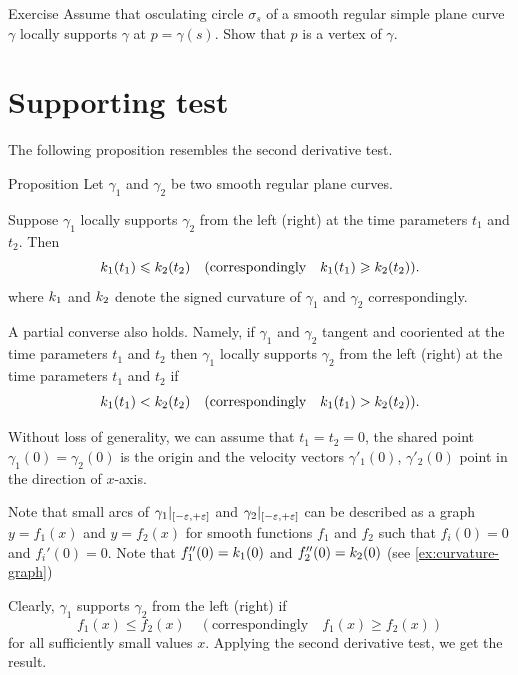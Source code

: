 \begin{thm}{Exercise}\label{ex:vertex-support}
Assume that osculating circle $\sigma_s$ of a smooth regular simple plane curve $\gamma$ locally supports $\gamma$ at $p=\gamma(s)$.
Show that $p$ is a vertex of $\gamma$.
\end{thm}

\section*{Supporting test}

The following proposition resembles the second derivative test. 

\begin{thm}{Proposition}\label{prop:supporting-circline}
Let $\gamma_1$ and $\gamma_2$ be two smooth regular plane curves.

Suppose $\gamma_1$ locally supports $\gamma_2$ from the left (right) at the time parameters $t_1$ and $t_2$.
Then 
\[k_1(t_1)\leqslant k_2(t_2)\quad(\text{correspondingly}\quad k_1(t_1)\geqslant k_2(t_2)).\]
where $k_1$ and $k_2$ denote the signed curvature of $\gamma_1$ and $\gamma_2$ correspondingly.

A partial converse also holds.
Namely, if $\gamma_1$ and $\gamma_2$ tangent and cooriented at the time parameters $t_1$ and $t_2$
then $\gamma_1$ locally supports $\gamma_2$ from the left (right) at the time parameters $t_1$ and $t_2$
if 
\[k_1(t_1)< k_2(t_2)\quad(\text{correspondingly}\quad k_1(t_1)> k_2(t_2)).\]

\end{thm}

 Without loss of generality, we can assume that $t_1=t_2=0$, the shared point $\gamma_1(0)=\gamma_2(0)$ is the origin and the velocity vectors $\gamma'_1(0)$, $\gamma'_2(0)$ point in the direction of $x$-axis.

Note that small arcs of $\gamma_1|_{[-\varepsilon,+\varepsilon]}$ and  $\gamma_2|_{[-\varepsilon,+\varepsilon]}$ can be described as a graph 
$y=f_1(x)$ and $y=f_2(x)$ for smooth functions $f_1$ and $f_2$ such that $f_i(0)=0$ and $f_i'(0)=0$.
Note that $f_1''(0)=k_1(0)$ and $f_2''(0)=k_2(0)$ (see \ref{ex:curvature-graph})

Clearly, $\gamma_1$ supports $\gamma_2$ from the left (right) if 
\[f_1(x)\le f_2(x)\quad(\text{correspondingly}\quad f_1(x)\ge f_2(x))\]
for all sufficiently small values $x$.
Applying the second derivative test, we get the result.
\qeds


